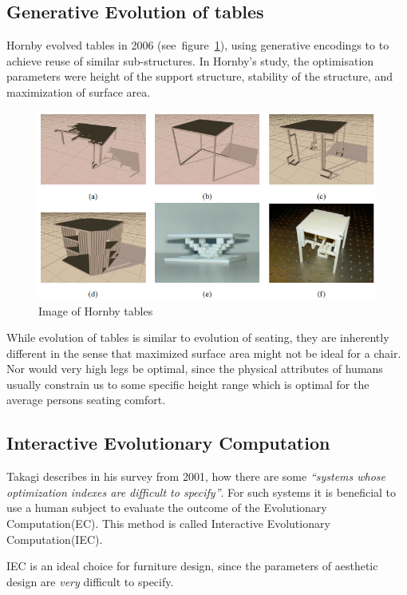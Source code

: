 \subsection{Generative Evolution of tables}
Hornby evolved tables in 2006 (see~figure~\ref{fig:hornby_tables}), using
generative encodings to to achieve reuse of similar sub-structures.
In Hornby's study, the optimisation parameters were height of the support
structure, stability of the structure, and maximization of surface area.
\begin{figure}[ht]
\includegraphics[scale=.6]{content/img/tables}
\caption{Image of Hornby tables\cite{paper:ev4}}
\label{fig:hornby_tables}
\end{figure}

While evolution of tables is similar to evolution of seating, they are
inherently different in the sense that maximized surface area might not be ideal
for a chair. Nor would very high legs be optimal, since the physical
attributes of humans usually constrain us to some specific height range which is
optimal for the average persons seating comfort.

\subsection{Interactive Evolutionary Computation}
Takagi describes in his survey from 2001\cite{Takagi2001}, how there are some 
\emph{``systems whose optimization indexes are difficult to 
specify''}\cite[p.~1275]{Takagi2001}.
For such systems it is beneficial to use a human subject to evaluate the outcome
of the Evolutionary Computation(EC). This method is called Interactive
Evolutionary Computation(IEC).

IEC is an ideal choice for furniture design, since the parameters of aesthetic
design are \emph{very} difficult to specify.

